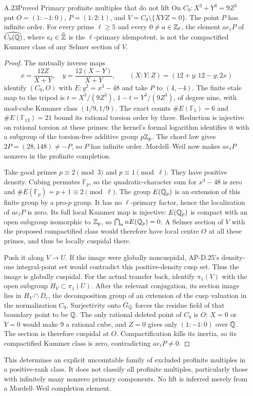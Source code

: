 \begin{statement}{A.23}{Proved}
{Primary profinite multiples that do not lift}
On $C_9:X^3+Y^3=9Z^3$ put $O=(1:-1:0)$,
$P=(1:2:1)$, and $V=C_9\setminus\{XYZ=0\}$.
The point $P$ has infinite order.  For every prime $\ell\ge5$ and
every $0\ne a\in\mathbb Z_\ell$, the element $a e_\ell P$ of
$\widehat{C_9(\mathbb Q)}$, where $e_\ell\in\widehat{\mathbb Z}$ is the
$\ell$-primary idempotent, is not the compactified Kummer class of
any Selmer section of $V$.
\end{statement}
\begin{proof}
The mutually inverse maps
\[
 x=\frac{12Z}{X+Y},\quad y=\frac{12(X-Y)}{X+Y},
 \qquad (X:Y:Z)=(12+y:12-y:2x)
\]
identify $(C_9,O)$ with $E:y^2=x^3-48$ and take $P$ to $(4,-4)$.
The finite etale map to the tripod is
$t=X^3/(9Z^3)$, $1-t=Y^3/(9Z^3)$, of degree nine, with mod-cube
Kummer class $(1/9,1/9)$.  The exact counts
$\#E(\mathbb F_5)=6$ and $\#E(\mathbb F_{13})=21$ bound its
rational torsion order by three.  Reduction is injective on rational
torsion at these primes: the kernel's formal logarithm identifies it
with a subgroup of the torsion-free additive group $p\mathbb Z_p$.
The chord law gives $2P=(28,148)\ne-P$, so $P$ has infinite order.
Mordell--Weil now makes $a e_\ell P$ nonzero in the profinite completion.

Take good primes $p\equiv2\pmod3$ and $p\equiv1\pmod\ell$.
They have positive density.  Cubing permutes $\mathbb F_p$, so the
quadratic-character sum for $x^3-48$ is zero and
$\#E(\mathbb F_p)=p+1\equiv2\pmod\ell$.
The group $E(\mathbb Q_p)$ is an extension of this finite group by a pro-$p$
group.  It has no $\ell$-primary factor, hence the localization of
$a e_\ell P$ is zero.  Its full local Kummer map is injective:
$E(\mathbb Q_p)$ is compact with an open subgroup isomorphic to $\mathbb Z_p$,
so $\bigcap_n nE(\mathbb Q_p)=0$.  A Selmer section of $V$ with the proposed
compactified class would therefore have local centre $O$ at all these
primes, and thus be locally cuspidal there.

Push it along $V\to U$.  If the image were globally noncuspidal,
AP-D.25's density-one integral-point set would contradict this
positive-density cusp set.  Thus the image is globally cuspidal.
For the actual transfer back, identify $\pi_1(V)$ with the open
subgroup $H_V\subset\pi_1(U)$.  After the relevant conjugation, its
section image lies in $H_V\cap D_c$, the decomposition group of an
extension of the cusp valuation in the normalization $C_9$.
Surjectivity onto $G_\mathbb Q$ forces the residue field of that boundary
point to be $\mathbb Q$.  The only rational deleted point of $C_9$ is $O$:
$X=0$ or $Y=0$ would make 9 a rational cube, and $Z=0$ gives only
$(1:-1:0)$ over $\mathbb Q$.  The section is therefore cuspidal at $O$.
Compactification kills its inertia, so its compactified Kummer class
is zero, contradicting $a e_\ell P\ne0$.
\end{proof}
This determines an explicit uncountable family of excluded profinite
multiples in a positive-rank class.  It does not classify all profinite
multiples, particularly those with infinitely many nonzero primary
components.  No lift is inferred merely from a Mordell--Weil
completion element.

